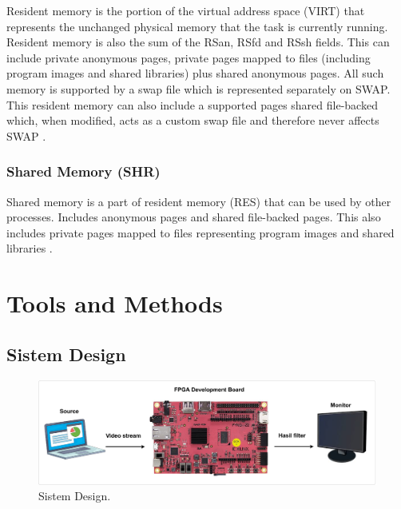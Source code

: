 Resident memory is the portion of the virtual address space (VIRT) that represents the unchanged physical memory that the task is currently running. Resident memory is also the sum of the RSan, RSfd and RSsh fields. This can include private anonymous pages, private pages mapped to files (including program images and shared libraries) plus shared anonymous pages. All such memory is supported by a swap file which is represented separately on SWAP. This resident memory can also include a supported pages shared file-backed which, when modified, acts as a custom swap file and therefore never affects SWAP \cite{manual:linux}.

\subsubsection{Shared Memory (SHR)}


Shared memory is a part of resident memory (RES) that can be used by other processes. Includes anonymous pages and shared file-backed pages. This also includes private pages mapped to files representing program images and shared libraries \cite{manual:linux}.



\section{Tools and Methods}

\subsection{Sistem Design}
\begin{figure}[ht]
    \includegraphics[width=1\linewidth, center]{images/rancangan-sistem2.png}
    \caption{Sistem Design.}
    \label{fig:rancangan-sistem}
\end{figure}

